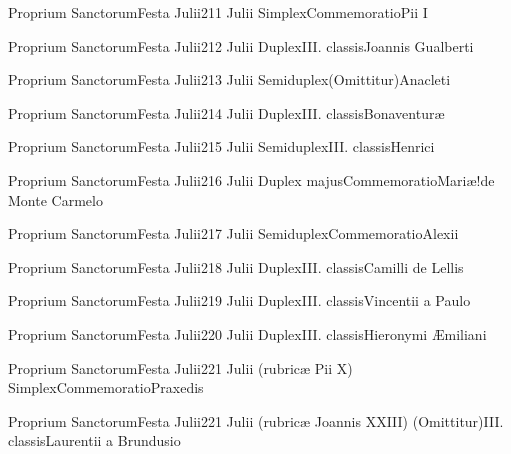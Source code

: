 \documentclass[invitatoriale-romanum.tex]{subfiles}
\begin{document}
	{Proprium Sanctorum}{Festa Julii}{2}{11 Julii}
	{Simplex}{Commemoratio}{Pii I}
	{}
	{\invitferia}


	{Proprium Sanctorum}{Festa Julii}{2}{12 Julii}
	{Duplex}{III. classis}{Joannis Gualberti}
	{}
	{}

	{Proprium Sanctorum}{Festa Julii}{2}{13 Julii}
	{Semiduplex}{(Omittitur)}{Anacleti}
	{}
	{\invitferia}


	{Proprium Sanctorum}{Festa Julii}{2}{14 Julii}
	{Duplex}{III. classis}{Bonaventuræ}
	{}
	{}

	{Proprium Sanctorum}{Festa Julii}{2}{15 Julii}
	{Semiduplex}{III. classis}{Henrici}
	{}
	{}

	{Proprium Sanctorum}{Festa Julii}{2}{16 Julii}
	{Duplex majus}{Commemoratio}{Mariæ!de Monte Carmelo}
	{}
	{\invitferia}

	{Proprium Sanctorum}{Festa Julii}{2}{17 Julii}
	{Semiduplex}{Commemoratio}{Alexii}
	{}
	{\invitferia}

	{Proprium Sanctorum}{Festa Julii}{2}{18 Julii}
	{Duplex}{III. classis}{Camilli de Lellis}
	{}
	{}

	{Proprium Sanctorum}{Festa Julii}{2}{19 Julii}
	{Duplex}{III. classis}{Vincentii a Paulo}
	{}
	{}

	{Proprium Sanctorum}{Festa Julii}{2}{20 Julii}
	{Duplex}{III. classis}{Hieronymi Æmiliani}
	{}
	{}

	{Proprium Sanctorum}{Festa Julii}{2}{21 Julii (rubricæ Pii X)}
	{Simplex}{Commemoratio}{Praxedis}
	{}
	{}


	{Proprium Sanctorum}{Festa Julii}{2}{21 Julii (rubricæ Joannis XXIII)}
	{(Omittitur)}{III. classis}{Laurentii a Brundusio}
	{}
	{}
\end{document}
